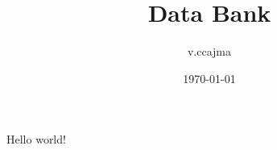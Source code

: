 \documentclass[12pt]{article}
\title{Data Bank}
\author{v.ccajma}
\date{\today}
\begin{document}
\maketitle

Hello world!
\end{document}
